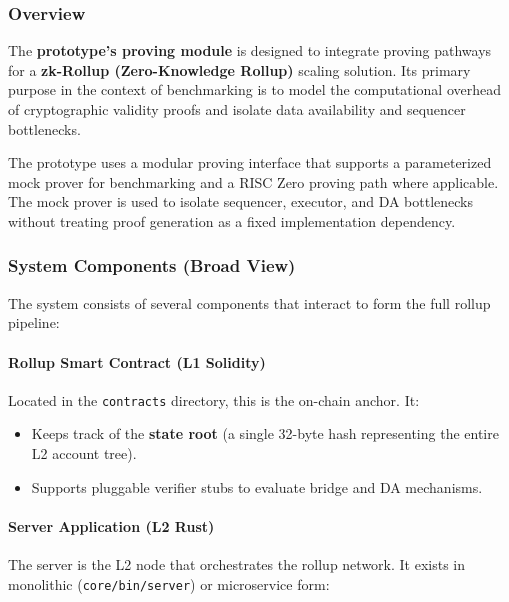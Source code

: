 \subsubsection{Overview}

The \textbf{prototype's proving module} is designed to integrate proving pathways for a \textbf{zk-Rollup (Zero-Knowledge Rollup)} scaling solution. Its primary purpose in the context of benchmarking is to model the computational overhead of cryptographic validity proofs and isolate data availability and sequencer bottlenecks.

The prototype uses a modular proving interface that supports a parameterized mock prover for benchmarking and a RISC Zero proving path where applicable. The mock prover is used to isolate sequencer, executor, and DA bottlenecks without treating proof generation as a fixed implementation dependency.

\subsubsection{System Components (Broad View)}

The system consists of several components that interact to form the full rollup pipeline:

\paragraph{Rollup Smart Contract (L1  Solidity)}

Located in the \texttt{contracts} directory, this is the on-chain anchor. It:
\begin{itemize}
    \item Keeps track of the \textbf{state root} (a single 32-byte hash representing the entire L2 account tree).
    \item Supports pluggable verifier stubs to evaluate bridge and DA mechanisms.
\end{itemize}

\paragraph{Server Application (L2  Rust)}

The server is the L2 node that orchestrates the rollup network. It exists in monolithic (\texttt{core/bin/server}) or microservice form:

